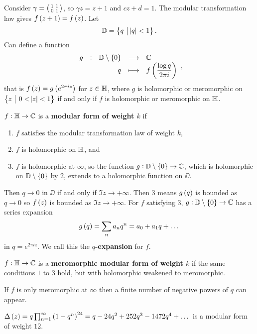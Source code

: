 Consider $ \gamma = \begin{psmallmatrix} 1 & 1 \\ 0 & 1 \end{psmallmatrix} $, so $ \gamma z = z + 1 $ and $ cz + d = 1 $. The modular transformation law gives $ f\br{z + 1} = f\br{z} $. Let
$$ \DD = \cbr{q \st \abs{q} < 1}. $$
Can define a function
$$ \function[g]{\DD \setminus \cbr{0}}{\CC}{q}{f\br{\dfrac{\log q}{2\pi i}}}, $$
that is $ f\br{z} = g\br{e^{2\pi iz}} $ for $ z \in \mathbb{H} $, where $ g $ is holomorphic or meromorphic on $ \cbr{z \st 0 < \abs{z} < 1} $ if and only if $ f $ is holomorphic or meromorphic on $ \mathbb{H} $.

\begin{definition}
$ f : \mathbb{H} \to \mathbb{C} $ is a \textbf{modular form of weight $ k $} if
\begin{enumerate}
\item $ f $ satisfies the modular transformation law of weight $ k $,
\item $ f $ is holomorphic on $ \mathbb{H} $, and
\item $ f $ is holomorphic at $ \infty $, so the function $ g : \DD \setminus \cbr{0} \to \CC $, which is holomorphic on $ \DD \setminus \cbr{0} $ by $ 2 $, extends to a holomorphic function on $ \DD $.
\end{enumerate}
\end{definition}

\pagebreak

Then $ q \to 0 $ in $ \DD $ if and only if $ \Im z \to +\infty $. Then $ 3 $ means $ g\br{q} $ is bounded as $ q \to 0 $ so $ f\br{z} $ is bounded as $ \Im z \to +\infty $. For $ f $ satisfying $ 3 $, $ g : \DD \setminus \cbr{0} \to \CC $ has a series expansion
$$ g\br{q} = \sum_n a_nq^n = a_0 + a_1q + \dots $$
in $ q = e^{2\pi iz} $. We call this the \textbf{$ q $-expansion} for $ f $.


\begin{definition}
$ f : \mathbb{H} \to \mathbb{C} $ is a \textbf{meromorphic modular form of weight $ k $} if the same conditions $ 1 $ to $ 3 $ hold, but with holomorphic weakened to meromorphic.
\end{definition}

\begin{note*}
If $ f $ is only meromorphic at $ \infty $ then a finite number of negative powers of $ q $ can appear.
\end{note*}

\begin{example*}
$ \Delta\br{z} = q\prod_{n = 1}^\infty \br{1 - q^n}^{24} = q - 24q^2 + 252q^3 - 1472q^4 + \dots $ is a modular form of weight $ 12 $.
\end{example*}

